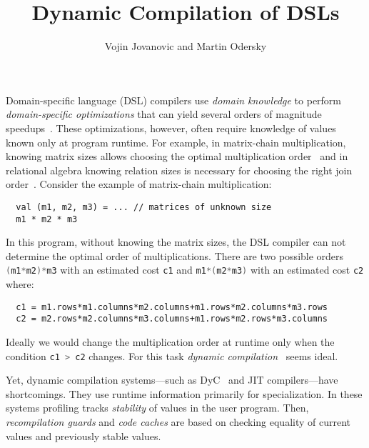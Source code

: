 \documentclass{llncs}
\newcommand{\scode}[1]{\lstinline[language=Scala,columns=fixed,basicstyle=\ttfamily,keywordstyle=\ttfamily]|#1|}
\newcommand{\code}[1]{\scode{#1}}
\begin{document}
\title{Dynamic Compilation of DSLs}

\author{Vojin Jovanovic and Martin Odersky}

\maketitle

Domain-specific language (DSL) compilers use \emph{domain knowledge} to perform
 \emph{domain-specific optimizations} that can yield several orders of magnitude speedups~\cite{rompf_optimizing_2013}.
 These optimizations, however, often require knowledge of values known only at program runtime. For example,
 in matrix-chain multiplication, knowing matrix sizes allows choosing the
 optimal multiplication order~\cite[Ch.~15.2]{cormen2001introduction} and
 in relational algebra knowing relation sizes is necessary for choosing the right join order~\cite{selinger1979access}.
 Consider the example of matrix-chain multiplication:
\vspace{0.5em}
\begin{lstlisting}
  val (m1, m2, m3) = ... // matrices of unknown size
  m1 * m2 * m3
\end{lstlisting}
\vspace{0.5em}

In this program, without knowing the matrix sizes, the DSL compiler can not determine the
 optimal order of multiplications. There are two possible orders
 \code{(m1*m2)*m3} with an estimated cost \code{c1} and \code{m1*(m2*m3)} with an estimated cost \code{c2} where:
 \vspace{0.5em}
\begin{lstlisting}
  c1 = m1.rows*m1.columns*m2.columns+m1.rows*m2.columns*m3.rows
  c2 = m2.rows*m2.columns*m3.columns+m1.rows*m2.rows*m3.columns
\end{lstlisting}
\vspace{0.5em}
Ideally we would change the multiplication order at runtime only when the condition \code{c1 > c2} changes. For this
task \emph{dynamic compilation}~\cite{auslander1996fast} seems ideal.

Yet, dynamic compilation systems---such as DyC~\cite{grant2000dyc} and JIT compilers---have shortcomings.
 They use runtime information primarily for specialization. In these systems
 profiling tracks \emph{stability} of values in the user program. Then, \emph{recompilation guards}
 and \emph{code caches} are based on checking equality of current values and previously stable
 values.
\end{document}
